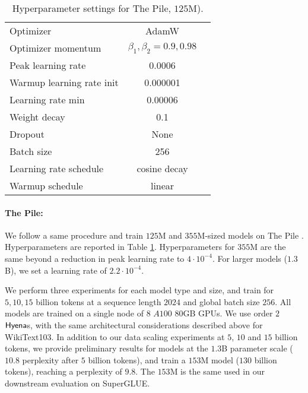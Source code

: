\begin{table}[ht]
      \small
      \caption{Hyperparameter settings for {\sc The Pile}, $125$M).
      }
        \centering
        \begin{tabular}{lcc}
            \toprule
            Optimizer & AdamW \\
            Optimizer momentum & $\beta_1,\beta_2=0.9,0.98$ \\
            Peak learning rate & 0.0006 \\
            Warmup learning rate init & 0.000001 \\
            Learning rate min &  0.00006 \\ 
            Weight decay & 0.1 \\
            Dropout & None \\
            Batch size & 256 \\
            Learning rate schedule & cosine decay \\
            Warmup schedule & linear \\
            \bottomrule
        \end{tabular}
        \label{tab:pilehyper}
\end{table}

\paragraph{The Pile:}
%
We follow a same procedure and train $125$M and $355$M-sized models on {\sc The Pile} \citep{gao2020pile}. Hyperparameters are reported in Table \ref{tab:pilehyper}. Hyperparameters for $355$M are the same beyond a reduction in peak learning rate to $4\cdot 10^{-4}$. For larger models ($1.3$B), we set a learning rate of $2.2 \cdot 10^{-4}$.

We perform three experiments for each model type and size, and train for $5, 10, 15$ billion tokens at a sequence length $2024$ and global batch size $256$. All models are trained on a single node of $8$ $A100$ $80$GB GPUs. We use order $2$ ${\sf Hyena}$s, with the same architectural considerations described above for {\sc WikiText103}.
%
In addition to our data scaling experiments at $5$, $10$ and $15$ billion tokens, we provide preliminary results for models at the $1.3$B parameter scale ($10.8$ perplexity after $5$ billion tokens), and train a $153$M model ($130$ billion tokens), reaching a perplexity of $9.8$. The $153$M is the same used in our downstream evaluation on SuperGLUE. 

